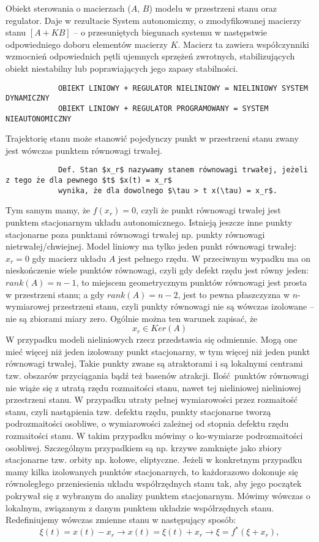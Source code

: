 \documentclass{article}
\begin{document}
		Obiekt sterowania o macierzach ($A$, $B$) modelu w przestrzeni stanu oraz regulator. Daje w rezultacie
		System autonomiczny, o zmodyfikowanej macierzy stanu $[A+KB]$ – o przesuniętych biegunach
		systemu w następstwie odpowiedniego doboru elementów macierzy $K$. Macierz ta zawiera współczynniki
		wzmocnień odpowiednich pętli ujemnych sprzężeń zwrotnych, stabilizujących obiekt
		niestabilny lub poprawiających jego zapasy stabilności.
		\begin{verbatim}
			OBIEKT LINIOWY + REGULATOR NIELINIOWY = NIELINIOWY SYSTEM DYNAMICZNY
			OBIEKT LINIOWY + REGULATOR PROGRAMOWANY = SYSTEM NIEAUTONOMICZNY
		\end{verbatim}
		Trajektorię stanu może stanowić pojedynczy punkt w przestrzeni stanu zwany jest wówczas
		punktem równowagi trwałej.
		\begin{verbatim}
			Def. Stan $x_r$ nazywamy stanem równowagi trwałej, jeżeli z tego że dla pewnego $t$ $x(t) = x_r$
			wynika, że dla dowolnego $\tau > t x(\tau) = x_r$.
		\end{verbatim}
		Tym samym mamy, że $f(x_r) = 0$, czyli że punkt równowagi trwałej jest punktem stacjonarnym
		układu autonomicznego.
		Istnieją jeszcze inne punkty stacjonarne poza punktami równowagi trwałej np. punkty
		równowagi nietrwałej/chwiejnej.
		Model liniowy ma tylko jeden punkt równowagi trwałej: $x_r = 0$ gdy macierz układu $A$ jest
		pełnego rzędu. W przeciwnym wypadku ma on nieskończenie wiele
		punktów równowagi, czyli gdy defekt rzędu jest równy jeden: $rank(A) = n-1$, to miejscem
		geometrycznym punktów równowagi jest prosta w przestrzeni stanu; a gdy $rank(A) = n-2$, jest
		to pewna płaszczyzna w $n$-wymiarowej przestrzeni stanu, czyli punkty równowagi nie są
		wówczas izolowane – nie są zbiorami miary zero. Ogólnie można ten warunek zapisać, że
		\begin{equation}
			x_r \in Ker(A)
		\end{equation}
		W przypadku modeli nieliniowych rzecz przedstawia się odmiennie. Mogą one mieć więcej niż
		jeden izolowany punkt stacjonarny, w tym więcej niż jeden punkt równowagi trwałej,
		Takie punkty zwane są atraktorami i są lokalnymi centrami tzw. obszarów przyciągania
		bądź też basenów atrakcji. Ilość punktów równowagi nie wiąże się z utratą rzędu
		rozmaitości stanu, nawet tej nieliniowej nieliniowej przestrzeni stanu.
		W przypadku utraty pełnej wymiarowości przez rozmaitość stanu, czyli nastąpienia tzw. defektu rzędu, punkty
		stacjonarne tworzą podrozmaitości osobliwe,
		o wymiarowości zależnej od stopnia defektu rzędu rozmaitości stanu. W takim
		przypadku mówimy o ko-wymiarze podrozmaitości osobliwej. Szczególnym przypadkiem są
		np. krzywe zamknięte jako zbiory stacjonarne tzw. orbity np. kołowe, eliptyczne.
		Jeżeli w konkretnym przypadku mamy kilka izolowanych punktów stacjonarnych, to
		każdorazowo dokonuje się równoległego przeniesienia układu współrzędnych stanu
		tak, aby jego początek pokrywał się z wybranym do analizy punktem stacjonarnym.
		Mówimy wówczas o lokalnym, związanym z danym punktem układzie współrzędnych stanu.
		Redefiniujemy wówczas zmienne stanu w następujący sposób:
		\begin{equation}
			\xi(t) = x(t)-x_r \to x(t) = \xi(t) + x_r \to \xi = f^*(\xi+x_r),	
		\end{equation}
\end{document}
